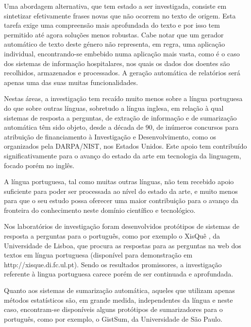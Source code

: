 \begin{multicols}{2}
Uma abordagem alternativa, que tem estado a ser investigada, consiste em sintetizar efetivamente frases novas
que não ocorrem no texto de origem. 
Esta tarefa exige uma compreensão mais aprofundada do texto e por isso tem permitido
até agora soluções menos robustas. 
Cabe notar que um gerador automático de texto deste género não representa, em regra, uma aplicação individual, 
encontrando-se embebido numa aplicação mais vasta, como é o caso dos sistemas de informação hospitalares, 
nos quais os dados dos doentes são recolhidos, armazenados e processados. 
A geração automática de relatórios será apenas uma das suas muitas funcionalidades.

Nestas áreas, a investigação tem recaído muito menos sobre a língua portuguesa do que 
sobre outras línguas, sobretudo a língua inglesa, em relação à qual sistemas 
de resposta a perguntas, de extração de informação e de sumarização automática têm sido objeto, 
desde a década de 90, de inúmeros concursos para atribuição de financiamento à Investigação
e Desenvolvimento, como os organizados pela DARPA/NIST, nos Estados Unidos.  
Este apoio tem contribuído significativamente para o avanço do estado da arte
em tecnologia da linguagem, focado porém no inglês. 

A língua portuguesa, tal como muitas outras línguas, não tem recebido apoio suficiente
para poder ser processada ao nível do estado da arte, e muito menos para
que o seu estudo possa oferecer uma maior contribuição para o avanço 
da fronteira do conhecimento neste domínio científico e tecnológico.


Nos laboratórios de investigação foram desenvolvidos protótipos de sistemas de resposta a perguntas para o português, como por exemplo o XisQuê \cite{xisque}, da Universidade de Lisboa, que procura as respostas para as perguntas na web dos textos em língua portuguesa (disponível para demonstração em http://xisque.di.fc.ul.pt).
Sendo os resultados promissores, a investigação referente à lingua portuguesa 
carece porém de ser continuada e aprofundada.

Quanto aos sistemas de sumarização automática, aqueles que utilizam apenas 
métodos estatísticos são, em grande medida, independentes da língua e neste caso, 
encontram-se disponíveis alguns protótipos de sumarizadores para o português,
como por exemplo, o GistSum, da Universidade de São Paulo.


\end{multicols}
